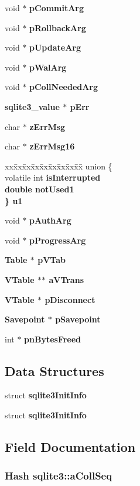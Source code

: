 \begin{CompactItemize}
\item 
void $\ast$ \bf{p\-Commit\-Arg}
\item 
void $\ast$ \bf{p\-Rollback\-Arg}
\item 
void $\ast$ \bf{p\-Update\-Arg}
\item 
void $\ast$ \bf{p\-Wal\-Arg}
\item 
void $\ast$ \bf{p\-Coll\-Needed\-Arg}
\item 
\bf{sqlite3\_\-value} $\ast$ \bf{p\-Err}
\item 
char $\ast$ \bf{z\-Err\-Msg}
\item 
char $\ast$ \bf{z\-Err\-Msg16}
\item 
\begin{tabbing}
xx\=xx\=xx\=xx\=xx\=xx\=xx\=xx\=xx\=\kill
union \{\\
\>volatile int \bf{isInterrupted}\\
\>double \bf{notUsed1}\\
\} \bf{u1}\\

\end{tabbing}\item 
void $\ast$ \bf{p\-Auth\-Arg}
\item 
void $\ast$ \bf{p\-Progress\-Arg}
\item 
\bf{Table} $\ast$ \bf{p\-VTab}
\item 
\bf{VTable} $\ast$$\ast$ \bf{a\-VTrans}
\item 
\bf{VTable} $\ast$ \bf{p\-Disconnect}
\item 
\bf{Savepoint} $\ast$ \bf{p\-Savepoint}
\item 
int $\ast$ \bf{pn\-Bytes\-Freed}
\end{CompactItemize}
\subsection*{Data Structures}
\begin{CompactItemize}
\item 
struct \bf{sqlite3Init\-Info}
\item 
struct \bf{sqlite3Init\-Info}
\end{CompactItemize}


\subsection{Field Documentation}
\subsubsection{\setlength{\rightskip}{0pt plus 5cm}\bf{Hash} \bf{sqlite3::a\-Coll\-Seq}}\label{structsqlite3_35a0566f03a64e1d44e3b44eca9e31c6}


